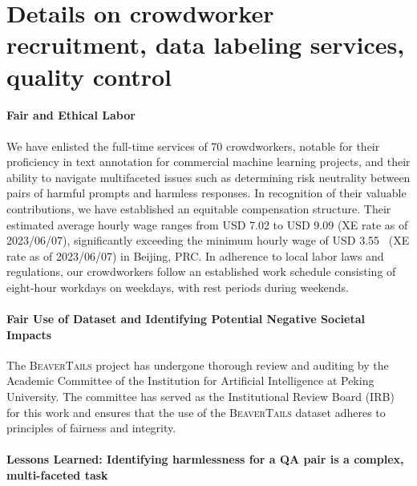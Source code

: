 \section{Details on crowdworker recruitment, data labeling services, quality control} \label{app:quality_control}

\paragraph{Fair and Ethical Labor} We have enlisted the full-time services of 70 crowdworkers, notable for their proficiency in text annotation for commercial machine learning projects, and their ability to navigate multifaceted issues such as determining risk neutrality between pairs of harmful prompts and harmless responses. In recognition of their valuable contributions, we have established an equitable compensation structure. Their estimated average hourly wage ranges from USD 7.02 to USD 9.09 (XE rate as of 2023/06/07), significantly exceeding the minimum hourly wage of USD 3.55~\cite{noauthor_undated-nz} (XE rate as of 2023/06/07) in Beijing, PRC. In adherence to local labor laws and regulations, our crowdworkers follow an established work schedule consisting of eight-hour workdays on weekdays, with rest periods during weekends. 

\vspace{-.7em}
\paragraph{Fair Use of Dataset and Identifying Potential Negative Societal Impacts} The \textsc{BeaverTails} project has undergone thorough review and auditing by the Academic Committee of the Institution for Artificial Intelligence at Peking University. The committee has served as the Institutional Review Board (IRB) for this work and ensures that the use of the \textsc{BeaverTails} dataset adheres to principles of fairness and integrity.

\paragraph{Lessons Learned: Identifying harmlessness for a QA pair is a complex, multi-faceted task}

